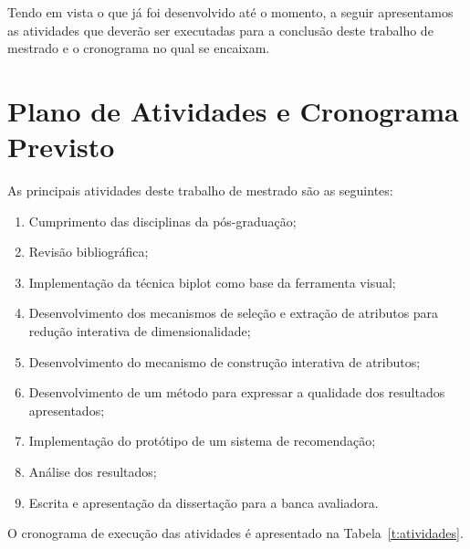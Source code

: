 Tendo em vista o que já foi desenvolvido até o momento, a
seguir apresentamos as atividades que deverão ser executadas
para a conclusão deste trabalho de mestrado e o cronograma
no qual se encaixam.

\clearpage

\section{Plano de Atividades e Cronograma Previsto}\label{sec:cronograma}

As principais atividades deste trabalho de mestrado são as seguintes:

\begin{enumerate}
    \item Cumprimento das disciplinas da pós-graduação;

    \item Revisão bibliográfica;

    \item Implementação da técnica biplot como base da
        ferramenta visual;

    \item Desenvolvimento dos mecanismos de seleção e
        extração de atributos para redução interativa de
        dimensionalidade;

    \item Desenvolvimento do mecanismo de construção
        interativa de atributos;

    \item Desenvolvimento de um método para expressar
        a qualidade dos resultados apresentados;

    \item Implementação do protótipo de um sistema de
        recomendação;

    \item Análise dos resultados;

    \item Escrita e apresentação da dissertação para a banca
        avaliadora. 
\end{enumerate}

O cronograma de execução das atividades é apresentado na Tabela~\ref{t:atividades}. 

\newcommand{\y}{\color{black}\rule{35pt}{7pt}}
\newcommand{\x}{\hspace*{35pt}}
\renewcommand{\r}{\color{cinza}\rule{35pt}{7pt}}
\setlength{\tabcolsep}{0pt}

